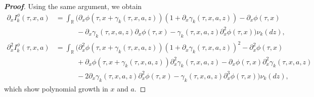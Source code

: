 \documentclass[11pt]{article}
\newcommand{\1}{\mathbbm{1}}
\begin{document}
\begin{proof}[\bf Proof]
Using the same argument, we obtain
\begin{align}
	\partial_xI^\phi_k(\tau,x,a)&=\int_{\mathbb{R}}\big(\partial_x\phi(\tau,x+\gamma_k(\tau,x,a,z))(1+\partial_x\gamma_k(\tau,x,a,z)) - \partial_x\phi(\tau,x)\\
	&\phantom{\int_{\mathbb{R}}\quad~~}  - \partial_x\gamma_k(\tau,x,a,z)\partial_x\phi(\tau,x) - \gamma_k(\tau,x,a,z)\partial_x^2\phi(\tau,x)\big)\nu_k(dz),\\
	\partial_x^2I^\phi_k(\tau,x,a)&=\int_{\mathbb{R}}\big(\partial_x^2\phi(\tau,x+\gamma_k(\tau,x,a,z))(1+\partial_x\gamma_k(\tau,x,a,z))^2 - \partial_x^2\phi(\tau,x)\\
	&\phantom{\int_{\mathbb{R}}\quad~~} + \partial_x\phi(\tau,x+\gamma_k(\tau,x,a,z))\partial_x^2\gamma_k(\tau,x,a,z) - \partial_x\phi(\tau,x)\partial_x^2\gamma_k(\tau,x,a,z) \\
	&\phantom{\int_{\mathbb{R}}\quad~~}-2\partial_x\gamma_k(\tau,x,a,z)\partial_x^2\phi(\tau,x)-\gamma_k(\tau,x,a,z)\partial_{x}^3\phi(\tau,x)\big)\nu_k(dz),
\end{align}
which show polynomial growth in $x$ and $a$.
\end{proof}
\end{document}
